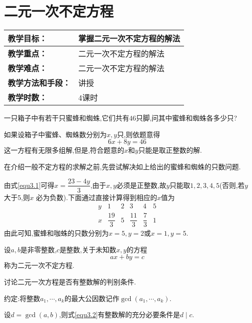 \section{二元一次不定方程}
\begin{table}[htb]
	\centering  
	\begin{tabular}{p{32mm}|p{95.6mm}}
		\hline 
		\textbf{教学目标：}       & 掌握二元一次不定方程的解法  \\ \hline
		\textbf{教学重点：}       & 二元一次不定方程的解法 \\ \hline
		\textbf{教学难点：}       & 二元一次不定方程的解法\\ \hline
		\textbf{教学方法和手段：} & 讲授  \\ \hline
		\textbf{教学时数：}       & 4课时 \\ \hline
	\end{tabular}
\end{table}
\entry 一只箱子中有若干只蜜蜂和蜘蛛,它们共有$46$只脚,问其中蜜蜂和蜘蛛各多少只?

如果设箱子中蜜蜂、蜘蛛数分别为$x, y$只,则依题意得
\begin{equation}\label{equ3.1}
	6 x+8 y=46
\end{equation}
这一方程有无限多组解,但是,符合题意的$x$和$y$只能是取正整数的解.

在介绍一般不定方程的求解之前,先尝试解决如上给出的蜜蜂和蜘蛛的只数问题.

由式\eqref{equ3.1}可得$x=\dfrac{23-4 y}{3}$,由于$x, y$必须是正整数,故$y$只能取$1,2,3,4,5$(否则,若$y$大于5,则$x$ 必为负数).下面通过直接计算得到相应的$x$值为
\begin{equation*}
	\begin{array}{cccccc}
		y & 1 & 2 & 3 & 4 & 5 \\
		x & \dfrac{19}{3} & 5 & \dfrac{11}{3} & \dfrac{7}{3} & 1
	\end{array}
\end{equation*}
由此可知,蜜蜂和咖蛛的只数分别为$x=5, y=2$或$x=1, y=5$.

 设$a, b$是非零整数,$c$是整数,关于未知数$x, y$的方程
\begin{equation}\label{equ3.2}
	a x+b y=c
\end{equation}
称为二元一次不定方程.

讨论二元一次方程是否有整数解的判别条件.

约定:将整数$a_{1}, \cdots, a_{k}$的最大公因数记作$\operatorname{gcd}\left(a_{1}, \cdots, a_{k}\right)$.

\theorem 设$d=\operatorname{gcd}(a, b)$,则式\eqref{equ3.2}有整数解的充分必要条件是$d \mid c$.

